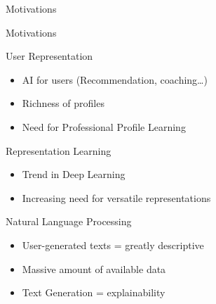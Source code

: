 \documentclass[compress,xcolor=table,aspectratio=169]{beamer}
\begin{document}
\begin{section}{Motivations}
    \begin{frame}{Motivations}
        \begin{block}{User Representation}
              \begin{itemize}
                    \item AI for users (Recommendation, coaching\dots)
                    \item Richness of profiles
                    \item Need for Professional Profile Learning
              \end{itemize}
          \end{block}
          \begin{block}{Representation Learning}
          \begin{itemize}
                \item Trend in Deep Learning
                \item Increasing need for versatile representations
          \end{itemize}
      \end{block}
      \begin{block}{Natural Language Processing}
          \begin{itemize}
              \item User-generated texts = greatly descriptive
              \item Massive amount of available data
              \item Text Generation = explainability
          \end{itemize}
      \end{block}
    \end{frame}
\end{section}
\end{document}
